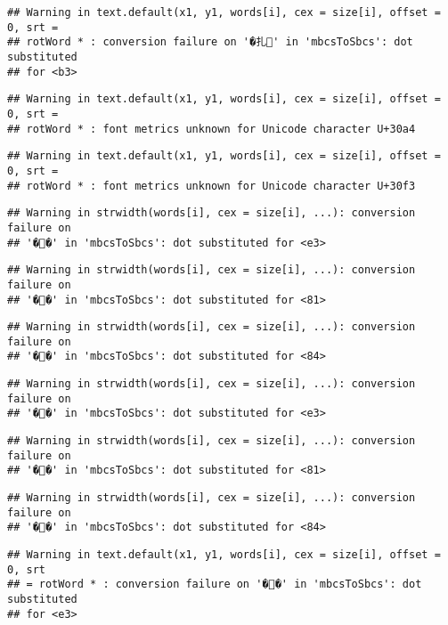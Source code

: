 \documentclass[]{article}
\begin{document}
\begin{verbatim}
## Warning in text.default(x1, y1, words[i], cex = size[i], offset = 0, srt =
## rotWord * : conversion failure on '�扎' in 'mbcsToSbcs': dot substituted
## for <b3>
\end{verbatim}

\begin{verbatim}
## Warning in text.default(x1, y1, words[i], cex = size[i], offset = 0, srt =
## rotWord * : font metrics unknown for Unicode character U+30a4
\end{verbatim}

\begin{verbatim}
## Warning in text.default(x1, y1, words[i], cex = size[i], offset = 0, srt =
## rotWord * : font metrics unknown for Unicode character U+30f3
\end{verbatim}

\begin{verbatim}
## Warning in strwidth(words[i], cex = size[i], ...): conversion failure on
## '��' in 'mbcsToSbcs': dot substituted for <e3>
\end{verbatim}

\begin{verbatim}
## Warning in strwidth(words[i], cex = size[i], ...): conversion failure on
## '��' in 'mbcsToSbcs': dot substituted for <81>
\end{verbatim}

\begin{verbatim}
## Warning in strwidth(words[i], cex = size[i], ...): conversion failure on
## '��' in 'mbcsToSbcs': dot substituted for <84>
\end{verbatim}

\begin{verbatim}
## Warning in strwidth(words[i], cex = size[i], ...): conversion failure on
## '��' in 'mbcsToSbcs': dot substituted for <e3>
\end{verbatim}

\begin{verbatim}
## Warning in strwidth(words[i], cex = size[i], ...): conversion failure on
## '��' in 'mbcsToSbcs': dot substituted for <81>
\end{verbatim}

\begin{verbatim}
## Warning in strwidth(words[i], cex = size[i], ...): conversion failure on
## '��' in 'mbcsToSbcs': dot substituted for <84>
\end{verbatim}

\begin{verbatim}
## Warning in text.default(x1, y1, words[i], cex = size[i], offset = 0, srt
## = rotWord * : conversion failure on '��' in 'mbcsToSbcs': dot substituted
## for <e3>
\end{verbatim}
\end{document}
